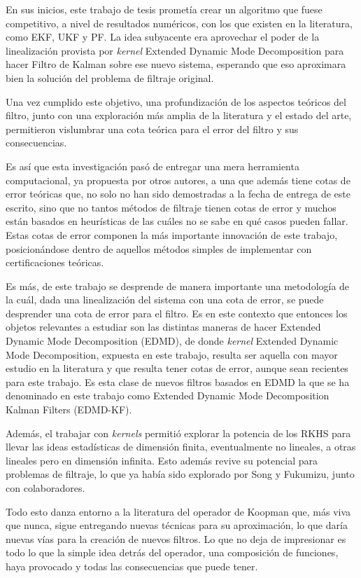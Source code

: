 En sus inicios, este trabajo de tesis prometía crear un algoritmo que fuese competitivo, a nivel de resultados numéricos, con los que existen en la literatura, como EKF, UKF y PF. La idea subyacente era aprovechar el poder de la linealización provista por \textit{kernel} Extended Dynamic Mode Decomposition para hacer Filtro de Kalman sobre ese nuevo sistema, esperando que eso aproximara bien la solución del problema de filtraje original.

Una vez cumplido este objetivo, una profundización de los aspectos teóricos del filtro, junto con una exploración más amplia de la literatura y el estado del arte, permitieron vislumbrar una cota teórica para el error del filtro y sus consecuencias.

Es así que esta investigación pasó de entregar una mera herramienta computacional, ya propuesta por otros autores, a una que además tiene cotas de error teóricas que, no solo no han sido demostradas a la fecha de entrega de este escrito, sino que no tantos métodos de filtraje tienen cotas de error y muchos están basados en heurísticas de las cuáles no se sabe en qué casos pueden fallar. Estas cotas de error componen la más importante innovación de este trabajo, posicionándose dentro de aquellos métodos simples de implementar con certificaciones teóricas.

Es más, de este trabajo se desprende de manera importante una metodología de la cuál, dada una linealización del sistema con una cota de error, se puede desprender una cota de error para el filtro. Es en este contexto que entonces los objetos relevantes a estudiar son las distintas maneras de hacer Extended Dynamic Mode Decomposition (EDMD), de donde \textit{kernel} Extended Dynamic Mode Decomposition, expuesta en este trabajo, resulta ser aquella con mayor estudio en la literatura y que resulta tener cotas de error, aunque sean recientes para este trabajo. Es esta clase de nuevos filtros basados en EDMD la que se ha denominado en este trabajo como Extended Dynamic Mode Decomposition Kalman Filters (EDMD-KF).

Además, el trabajar con \textit{kernels} permitió explorar la potencia de los RKHS para llevar las ideas estadísticas de dimensión finita, eventualmente no lineales, a otras lineales pero en dimensión infinita. Esto además revive su potencial para problemas de filtraje, lo que ya había sido explorado por Song y Fukumizu, junto con colaboradores.

Todo esto danza entorno a la literatura del operador de Koopman que, más viva que nunca, sigue entregando nuevas técnicas para su aproximación, lo que daría nuevas vías para la creación de nuevos filtros. Lo que no deja de impresionar es todo lo que la simple idea detrás del operador, una composición de funciones, haya provocado y todas las consecuencias que puede tener.

